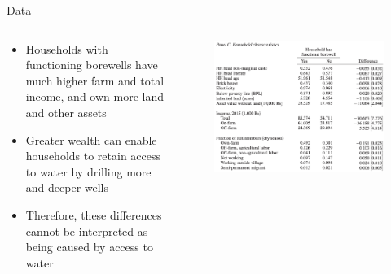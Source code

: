 \documentclass[10pt]{beamer}
\begin{document}
\begin{frame}
	{Data}
	\begin{columns}
		\begin{column}{0.4\textwidth}
			\begin{itemize}
				\item Households with functioning borewells have much higher farm and total
				      income, and own more land and other assets
				\item Greater wealth can enable households to retain access to water by drilling more and deeper wells
				\item Therefore, these differences cannot be interpreted as being caused by access to water
			\end{itemize}
		\end{column}
		\begin{column}{0.6\textwidth}
			\begin{figure}
				\centering
				\includegraphics[width=1\textwidth]{table1_c.png}
			\end{figure}
		\end{column}
	\end{columns}
\end{frame}

\end{document}
